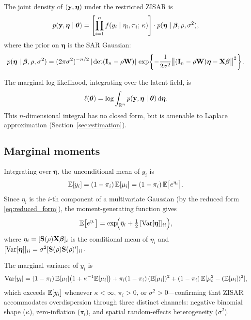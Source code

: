 The joint density of $(\mathbf{y}, \boldsymbol{\eta})$ under the restricted ZISAR is
\begin{equation}\label{eq:joint}
  p(\mathbf{y},\boldsymbol{\eta} \mid \boldsymbol{\theta}) =
  \left[\prod_{i=1}^{n} f(y_i \mid \eta_i, \pi_i;\,\kappa)\right]
  \cdot p(\boldsymbol{\eta} \mid \boldsymbol{\beta}, \rho, \sigma^2),
\end{equation}
where the prior on $\boldsymbol{\eta}$ is the SAR Gaussian:
\begin{equation}\label{eq:sar_prior}
  p(\boldsymbol{\eta} \mid \boldsymbol{\beta},\rho,\sigma^2) =
  (2\pi\sigma^2)^{-n/2}\,|\det(\mathbf{I}_n - \rho\mathbf{W})|\,
  \exp\!\left\{-\frac{1}{2\sigma^2}\bigl\|(\mathbf{I}_n - \rho\mathbf{W})\boldsymbol{\eta} - \mathbf{X}\boldsymbol{\beta}\bigr\|^2\right\}.
\end{equation}

The marginal log-likelihood, integrating over the latent field, is
\begin{equation}\label{eq:margloglik}
  \ell(\boldsymbol{\theta}) = \log \int_{\mathbb{R}^n} p(\mathbf{y},\boldsymbol{\eta} \mid \boldsymbol{\theta})\,\mathrm{d}\boldsymbol{\eta}.
\end{equation}
This $n$-dimensional integral has no closed form, but is amenable to Laplace approximation (Section~\ref{sec:estimation}).

\subsection{Marginal moments}\label{sec:model_moments}

Integrating over $\boldsymbol{\eta}$, the unconditional mean of $y_i$ is
\begin{equation}\label{eq:margmean}
  \mathbb{E}[y_i] = (1 - \pi_i)\,\mathbb{E}[\mu_i] = (1 - \pi_i)\,\mathbb{E}\bigl[e^{\eta_i}\bigr].
\end{equation}
Since $\eta_i$ is the $i$-th component of a multivariate Gaussian (by the reduced form \eqref{eq:reduced_form}), the moment-generating function gives
\begin{equation}\label{eq:E_mu}
  \mathbb{E}\bigl[e^{\eta_i}\bigr] = \exp\!\Bigl(\bar{\eta}_i + \tfrac{1}{2}\,[\mathrm{Var}[\boldsymbol{\eta}]]_{ii}\Bigr),
\end{equation}
where $\bar{\eta}_i = [\mathbf{S}(\rho)\mathbf{X}\boldsymbol{\beta}]_i$ is the conditional mean of $\eta_i$ and $[\mathrm{Var}[\boldsymbol{\eta}]]_{ii} = \sigma^2[\mathbf{S}(\rho)\mathbf{S}(\rho)']_{ii}$.

The marginal variance of $y_i$ is
\begin{equation}\label{eq:margvar}
  \mathrm{Var}[y_i] = (1-\pi_i)\,\mathbb{E}[\mu_i]\bigl(1 + \kappa^{-1}\mathbb{E}[\mu_i]\bigr) + \pi_i(1-\pi_i)\,(\mathbb{E}[\mu_i])^2 + (1-\pi_i)\,\mathbb{E}[\mu_i^2 - (\mathbb{E}[\mu_i])^2],
\end{equation}
which exceeds $\mathbb{E}[y_i]$ whenever $\kappa < \infty$, $\pi_i > 0$, or $\sigma^2 > 0$---confirming that ZISAR accommodates overdispersion through three distinct channels: negative binomial shape ($\kappa$), zero-inflation ($\pi_i$), and spatial random-effects heterogeneity ($\sigma^2$).

